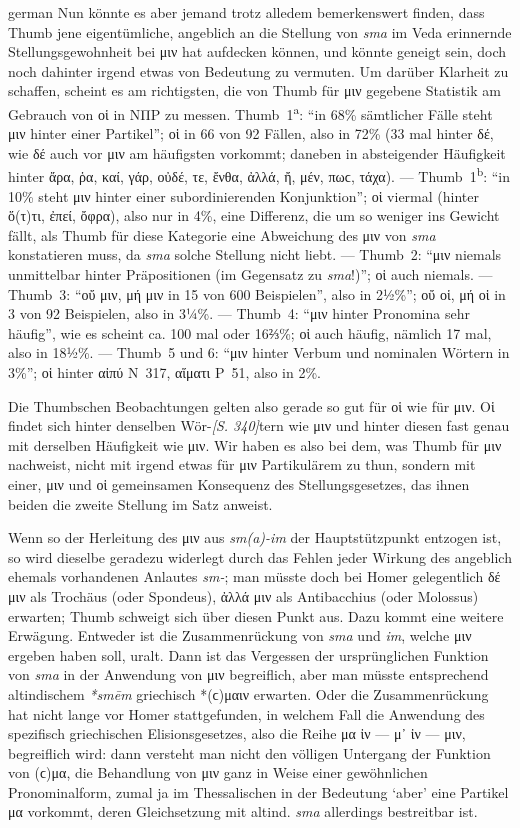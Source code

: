 \begin{otherlanguage*}{german}
Nun könnte es aber jemand trotz alledem bemerkenswert finden, dass Thumb jene eigentümliche, angeblich an die Stellung von \emph{sma} im Veda erinnernde Stellungsgewohnheit bei μιν hat aufdecken können, und könnte geneigt sein, doch noch dahinter irgend etwas von Bedeutung zu vermuten. Um darüber Klarheit zu schaffen, scheint es am richtigsten, die von Thumb für μιν gegebene Statistik am Gebrauch von οἱ in ΝΠΡ zu messen. Thumb~1\textsuperscript{a}: “in 68\% sämtlicher Fälle steht μιν hinter einer Partikel”; οἱ in 66 von 92 Fällen, also in 72\% (33 mal hinter δέ, wie δέ auch vor μιν am häufigsten vorkommt; daneben in absteigender Häufigkeit hinter ἄρα, ῥα, καί, γάρ, οὐδέ, τε, ἔνθα, ἀλλά, ἤ, μέν, πωϲ, τάχα). — Thumb~1\textsuperscript{b}: “in 10\% steht μιν hinter einer subordinierenden Konjunktion”; οἱ viermal (hinter ὅ(τ)τι, ἐπεί, ὄφρα), also nur in 4\%, eine Differenz, die um so weniger ins Gewicht fällt, als Thumb für diese Kategorie eine Abweichung des μιν von \emph{sma} konstatieren muss, da \emph{sma} solche Stellung nicht liebt. — Thumb~2: “μιν niemals unmittelbar hinter Präpositionen (im Gegensatz zu \emph{sma}!)”; οἱ auch niemals. — Thumb~3: “οὔ μιν, μή μιν in 15 von 600 Beispielen”, also in 2½\%”; οὔ οἱ, μή οἱ in 3 von 92 Beispielen, also in 3¼\%. — Thumb~4: “μιν hinter Pronomina sehr häufig”, wie es scheint ca. 100 mal oder 16⅔\%; οἱ auch häufig, nämlich 17 mal, also in 18½\%. — Thumb~5 und 6: “μιν hinter Verbum und nominalen Wörtern in 3\%”; οἱ hinter αἰπύ Ν~317, αἵματι Ρ~51, also in 2\%.

Die Thumbschen Beobachtungen gelten also gerade so gut für οἱ wie für μιν. Οἱ findet sich hinter denselben Wör-\hypertarget{p340}{\emph{[S. 340]}}\label{p340}tern wie μιν und hinter diesen fast genau mit derselben Häufigkeit wie μιν. Wir haben es also bei dem, was Thumb für μιν nachweist, nicht mit irgend etwas für μιν Partikulärem zu thun, sondern mit einer, μιν und οἱ gemeinsamen Konsequenz des Stellungsgesetzes, das ihnen beiden die zweite Stellung im Satz anweist.

Wenn so der Herleitung des μιν aus \emph{sm(a)-im} der Hauptstützpunkt entzogen ist, so wird dieselbe geradezu widerlegt durch das Fehlen jeder Wirkung des angeblich ehemals vorhandenen Anlautes \emph{sm-}; man müsste doch bei Homer gelegentlich δέ μιν als Trochäus (oder Spondeus), ἀλλά μιν als Antibacchius (oder Molossus) erwarten; Thumb schweigt sich über diesen Punkt aus. Dazu kommt eine weitere Erwägung. Entweder ist die Zusammenrückung von \emph{sma} und \emph{im}, welche μιν ergeben haben soll, uralt. Dann ist das Vergessen der ursprünglichen Funktion von \emph{sma} in der Anwendung von μιν begreiflich, aber man müsste entsprechend altindischem \emph{*smēm} griechisch *(ϲ)μαιν erwarten. Oder die Zusammenrückung hat nicht lange vor Homer stattgefunden, in welchem Fall die Anwendung des spezifisch griechischen Elisionsgesetzes, also die Reihe μα ἰν — μ᾽ ἰν — μιν, begreiflich wird: dann versteht man nicht den völligen Untergang der Funktion von (ϲ)μα, die Behandlung von μιν ganz in Weise einer gewöhnlichen Pronominalform, zumal ja im Thessalischen in der Bedeutung ‘aber’ eine Partikel μα vorkommt, deren Gleichsetzung mit altind. \emph{sma} allerdings bestreitbar ist.


\end{otherlanguage*}
